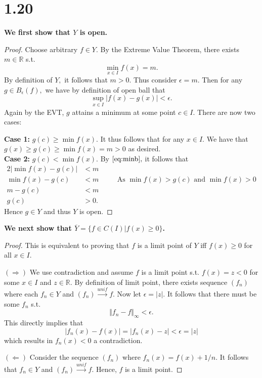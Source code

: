 \documentclass[10pt]{article}
\begin{document}
\section*{1.20}

\textbf{We first show that $Y$ is open.}

\begin{proof}
    Choose arbitrary $f\in Y.$ By the Extreme Value Theorem, there exists $m\in\mathbb{R}$ s.t.
    \[\min_{x\in I}f(x)=m.\]
    By definition of $Y,$ it follows that $m>0.$ Thus consider $\epsilon = m.$ Then for any $g\in B_\epsilon(f),$ we have by definition of open ball that
    \begin{equation} \label{eq:minb}
        \sup_{x\in I} |f(x)-g(x)| < \epsilon.
    \end{equation}
    Again by the EVT, $g$ attains a minimum at some point $c\in I.$ There are now two cases:

    \noindent
    \textbf{Case 1:} $g(c) \ge \min f(x).$ It thus follows that for any $x\in I.$ We have that $g(x)\ge g(c)\ge \min f(x) = m > 0$ as desired.\\
    \noindent
    \textbf{Case 2:} $g(c)< \min f(x).$
    By $\eqref{eq:minb},$ it follows that
    \begin{alignat*}{2}
        |\min f(x)-g(c)| &< m\\
        \min f(x)- g(c) &< m \quad&&\text{As $\min f(x)>g(c)$ and $\min f(x)>0$}\\
        m-g(c) &< m\\
        g(c) &> 0.
    \end{alignat*}
    Hence $g\in Y$ and thus $Y$ is open.
\end{proof}

\noindent
\textbf{We next show that $\overline{Y} = \{f\in C(I)| f(x)\ge0\}$.}

\begin{proof}
    This is equivalent to proving that $f$ is a limit point of $Y$ iff $f(x)\ge 0$ for all $x\in I.$

    $(\Rightarrow)$ We use contradiction and assume $f$ is a limit point s.t. $f(x) = z < 0$ for some $x\in I$ and $z\in\mathbb{R}.$ By definition of limit point, there exists sequence $(f_n)$ where each $f_n\in Y$ and $(f_n)\stackrel{unif}{\to}f.$ Now let $\epsilon = |z|.$ It follows that there must be some $f_n$ s.t.
    \[\Vert f_n -f \Vert_\infty < \epsilon.\]
    This directly implies that
    \[|f_n(x)-f(x)|= |f_n(x)-z|<\epsilon = |z|\]
    which results in $f_n(x) < 0$ a contradiction.

    $(\Leftarrow)$ Consider the sequence $(f_n)$ where $f_n(x) = f(x) + 1/n.$ It follows that $f_n \in Y$ and $(f_n)\stackrel{unif}{\to}f.$ Hence, $f$ is a limit point.
\end{proof}
\end{document}
